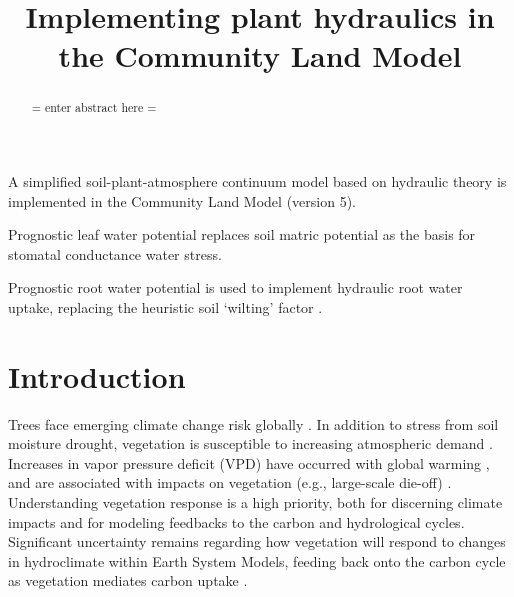 \documentclass[draft,linenumbers]{agujournal}
\begin{document}
\title{Implementing plant hydraulics in the Community Land Model}



\begin{keypoints}
\item A simplified soil-plant-atmosphere continuum model based on hydraulic theory is implemented in the Community Land Model (version 5).
\item Prognostic leaf water potential replaces soil matric potential as the basis for stomatal conductance water stress. 
\item Prognostic root water potential is used to implement hydraulic root water uptake, replacing the heuristic soil `wilting' factor .
\end{keypoints}



\begin{abstract}
= enter abstract here =
\end{abstract}


\section{Introduction}

Trees face emerging climate change risk globally \citep{allen2010,anderegg2013b}.
In addition to stress from soil moisture drought, vegetation is susceptible to increasing atmospheric demand \citep{restaino2016,novick2016b,lemordant2018}.
Increases in vapor pressure deficit (VPD) have occurred with global warming \citep{ficklin2017,seager2015}, and are associated with impacts on vegetation (e.g., large-scale die-off) \citep{williams2013,mcdowell2015}.
Understanding vegetation response is a high priority, both for discerning climate impacts and for modeling feedbacks to the carbon and hydrological cycles.
Significant uncertainty remains regarding how vegetation will respond to changes in hydroclimate within Earth System Models, feeding back onto the carbon cycle as vegetation mediates carbon uptake \citep{dekauwe2017,friedlingstein2014,trugman2018}.
\end{document}

